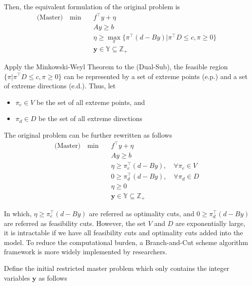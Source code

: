             Then, the equivalent formulation of the original problem is
            \begin{align*}
                \text{(Master)} \quad \min \quad & f^\top y + \eta\\
                & Ay \ge b\\
                & \eta \ge \max_\pi \{\pi^\top (d - By) | \pi^\top D \le c, \pi \ge 0\}\\
                & \mathbf{y} \in \mathbb{Y} \subseteq \mathbb{Z}_+
            \end{align*}

            Apply the Minkowski-Weyl Theorem to the (Dual-Sub), the feasible region $\{\pi|\pi^\top D \le c, \pi \ge 0\}$ can be represented by a set of extreme points (e.p.) and a set of extreme directions (e.d.). Thus, let

            \begin{itemize}
                \item $\pi_e \in V$ be the set of all extreme points, and 
                \item $\pi_d \in D$ be the set of all extreme directions
            \end{itemize}

            The original problem can be further rewritten as follows
            \begin{align*}
                \text{(Master)} \quad \min \quad & f^\top y + \eta\\
                & Ay \ge b\\
                & \eta \ge \pi_e^\top (d - By), \quad \forall \pi_e \in V\\
                & 0 \ge \pi_d^\top (d - By), \quad \forall \pi_d \in D\\
                & \eta \ge 0\\
                & \mathbf{y} \in \mathbb{Y} \subseteq \mathbb{Z}_+
            \end{align*}

            In which, $\eta \ge \pi_e^\top (d - By)$ are referred as optimality cuts, and $0 \ge \pi_d^\top (d - By)$ are referred as feasibility cuts. However, the set $V$ and $D$ are exponentially large, it is intractable if we have all feasibility cuts and optimality cuts added into the model. To reduce the computational burden, a Branch-and-Cut scheme algorithm framework is more widely implemented by researchers.

            Define the initial restricted master problem which only contains the integer variables $\mathbf{y}$ as follows

